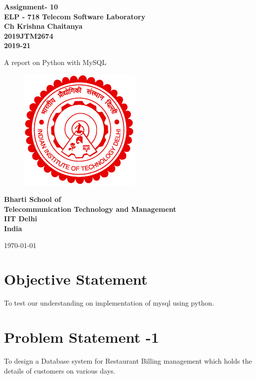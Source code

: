 \documentclass[12pt]{article}
\begin{document}
  \begin{titlepage}
    \begin{center}
      \begin{Large}
      \textbf{ Assignment- 10\\
       \vspace*{0.5cm}
       ELP - 718 Telecom Software Laboratory\\
       \vspace{1cm}
       Ch Krishna Chaitanya\\
       2019JTM2674\\
       2019-21\\}
      \end{Large}
       \vspace{1cm}
      {\Large  A report on Python with MySQL}
       \vfill
       \begin{figure}[h!]
          \centering
          \includegraphics{iitdelhi.png}
       \end{figure}
       \vfill
      \begin{Large}
      \textbf{ Bharti School of \\
       Telecommunication Technology and Management\\
       IIT Delhi\\
       India\\
      }\end{Large}
       \medskip
       \today
    \end{center}
    \vfill
  \end{titlepage}
  
  \tableofcontents
  
  \clearpage
  \section*{Objective Statement}
   To test our understanding on implementation of mysql using python.

  \section{Problem Statement -1}
 To design a Database system for Restaurant Billing management which holds the details of customers on various days.
\end{document}
